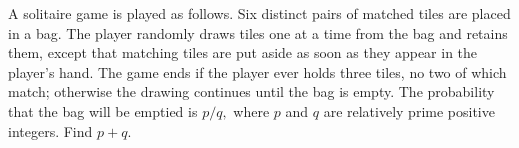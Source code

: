 A solitaire game is played as follows.  Six distinct pairs of matched tiles are placed in a bag.  The player randomly draws tiles one at a time from the bag and retains them, except that matching tiles are put aside as soon as they appear in the player's hand.  The game ends if the player ever holds three tiles, no two of which match; otherwise the drawing continues until the bag is empty.  The probability that the bag will be emptied is $p/q,$ where $p$ and $q$ are relatively prime positive integers.  Find $p+q.$
